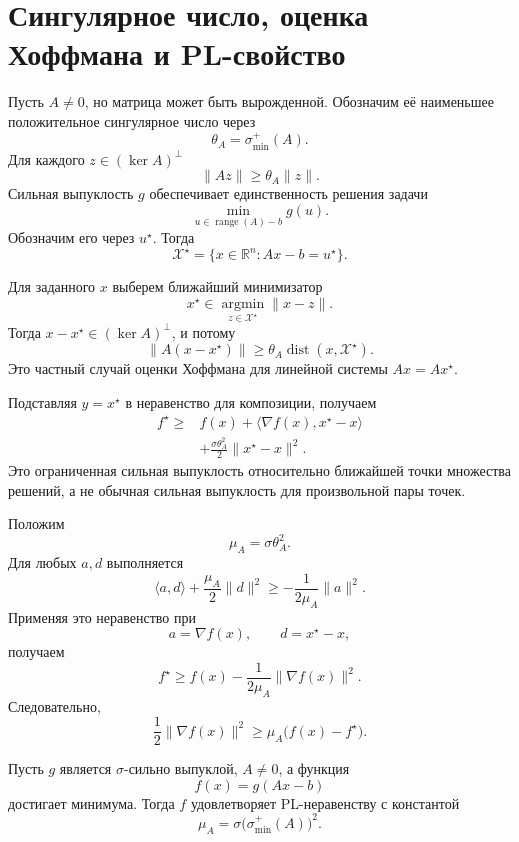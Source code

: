 \section{Сингулярное число, оценка Хоффмана и PL-свойство}

Пусть \(A\ne0\), но матрица может быть вырожденной. Обозначим её
наименьшее положительное сингулярное число через
\[
    \theta_A=\sigma_{\min}^{+}(A).
\]
Для каждого \(z\in(\ker A)^\perp\)
\[
    \lVert Az\rVert\ge\theta_A\lVert z\rVert.
\]
Сильная выпуклость \(g\) обеспечивает единственность решения задачи
\[
    \min_{u\in\operatorname{range}(A)-b}g(u).
\]
Обозначим его через \(u^\star\). Тогда
\[
    \mathcal X^\star
    =
    \{x\in\mathbb R^n:Ax-b=u^\star\}.
\]

Для заданного \(x\) выберем ближайший минимизатор
\[
    x^\star
    \in
    \operatorname*{argmin}_{z\in\mathcal X^\star}
    \lVert x-z\rVert.
\]
Тогда \(x-x^\star\in(\ker A)^\perp\), и потому
\[
    \lVert A(x-x^\star)\rVert
    \ge
    \theta_A\operatorname{dist}(x,\mathcal X^\star).
\]
Это частный случай оценки Хоффмана для линейной системы
\(Ax=Ax^\star\).

Подставляя \(y=x^\star\) в неравенство для композиции, получаем
\[
\begin{aligned}
    f^\star
    \ge{}&
    f(x)
    +\langle\nabla f(x),x^\star-x\rangle
    \\
    &+
    \frac{\sigma\theta_A^2}{2}
    \lVert x^\star-x\rVert^2.
\end{aligned}
\]
Это ограниченная сильная выпуклость относительно ближайшей точки
множества решений, а не обычная сильная выпуклость для произвольной
пары точек.

Положим
\[
    \mu_A=\sigma\theta_A^2.
\]
Для любых \(a,d\) выполняется
\[
    \langle a,d\rangle
    +\frac{\mu_A}{2}\lVert d\rVert^2
    \ge
    -\frac1{2\mu_A}\lVert a\rVert^2.
\]
Применяя это неравенство при
\[
    a=\nabla f(x),
    \qquad
    d=x^\star-x,
\]
получаем
\[
    f^\star
    \ge
    f(x)-\frac1{2\mu_A}\lVert\nabla f(x)\rVert^2.
\]
Следовательно,
\[
    \frac12\lVert\nabla f(x)\rVert^2
    \ge
    \mu_A\bigl(f(x)-f^\star\bigr).
\]

\begin{theorem}
Пусть \(g\) является \(\sigma\)-сильно выпуклой, \(A\ne0\), а
функция
\[
    f(x)=g(Ax-b)
\]
достигает минимума. Тогда \(f\) удовлетворяет PL-неравенству с
константой
\[
    \mu_A
    =
    \sigma
    \bigl(\sigma_{\min}^{+}(A)\bigr)^2.
\]
\end{theorem}

